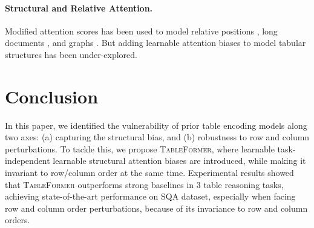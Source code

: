 \documentclass[11pt]{article}
\begin{document}
\paragraph{Structural and Relative Attention.} Modified attention scores has been used to model relative positions \cite{shaw2018self}, long documents \cite{dai2019transformer,Beltagy2020Longformer,ainslie2020etc}, and graphs \cite{ying2021transformers}. But adding learnable attention biases to model tabular structures has been under-explored.
\section{Conclusion}

In this paper, we identified the vulnerability of prior table encoding models along two axes: (a) capturing the structural bias, and (b) robustness to row and column perturbations. To tackle this, we propose \textsc{TableFormer}, where learnable task-independent learnable structural attention biases are introduced, while making it invariant to row/column order at the same time. Experimental results showed that \textsc{TableFormer} outperforms strong baselines in 3 table reasoning tasks, achieving state-of-the-art performance on SQA dataset, especially when facing row and column order perturbations, because of its invariance to  row and column orders.
\end{document}
